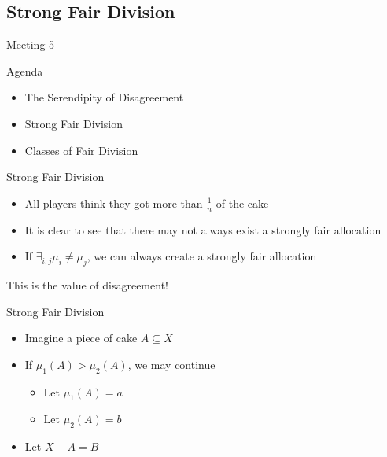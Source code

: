 \documentclass[aspectratio=169,xcolor=dvipsnames]{beamer}
\begin{document}
\subsection{Strong Fair Division}
\begin{frame}{Meeting 5}
	\begin{block}{Agenda}
		\begin{itemize}
			\item The Serendipity of Disagreement
			\item Strong Fair Division
			\item Classes of Fair Division
		\end{itemize}
	\end{block}
\end{frame}
\begin{frame}{Strong Fair Division}
	\begin{itemize}
		\item All players think they got more than $\frac{1}{n}$ of the cake \pause
		\item It is clear to see that there may not always exist a strongly fair allocation \pause
		\item If $ \exists_{i, j} \mu_i \neq \mu_j$, we can always create a strongly fair allocation
	\end{itemize}
This is the value of disagreement!
\end{frame}
\begin{frame}{Strong Fair Division}
	\begin{itemize}
		\item Imagine a piece of cake $A \subseteq X$
		\item If $\mu_1 (A) > \mu_2 (A)$, we may continue \pause
		\begin{itemize} 
			\item Let $ \mu_1 (A) = a$
			\item Let $ \mu_2 (A) = b$
		\end{itemize}
		\item Let $ X - A = B$
	\end{itemize}
\end{frame}
\end{document}
